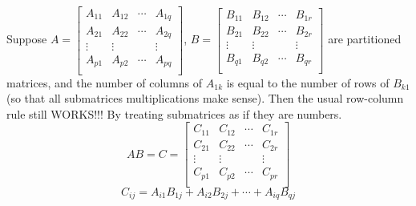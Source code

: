\documentclass{beamer}
\theoremstyle{definition}
\theoremstyle{remark}
\begin{document}
\begin{frame}[t]
\begin{fact}
Suppose $A=\begin{bmatrix}
A_{11}&A_{12}&\cdots& A_{1q}\\
A_{21}&A_{22}&\cdots& A_{2q}\\
\vdots&\vdots&&\vdots\\
A_{p1}&A_{p2}&\cdots& A_{pq}\\
\end{bmatrix}$, $B=\begin{bmatrix}
B_{11}&B_{12}&\cdots& B_{1r}\\
B_{21}&B_{22}&\cdots& B_{2r}\\
\vdots&\vdots&&\vdots\\
B_{q1}&B_{q2}&\cdots& B_{qr}\\
\end{bmatrix}$ are partitioned matrices, and the number of columns of $A_{1k}$ is equal to the number of rows of $B_{k1}$ (so that all submatrices multiplications make sense).\pause
Then the usual row-column rule still WORKS!!! By treating submatrices as if they are numbers.
\[
AB=C=\begin{bmatrix}
C_{11}&C_{12}&\cdots& C_{1r}\\
C_{21}&C_{22}&\cdots& C_{2r}\\
\vdots&\vdots&&\vdots\\
C_{p1}&C_{p2}&\cdots& C_{pr}\\
\end{bmatrix}
\]
\[
C_{ij}=A_{i1}B_{1j}+A_{i2}B_{2j}+\cdots+A_{iq}B_{qj}
\]
\end{fact}
\end{frame}
\end{document}
